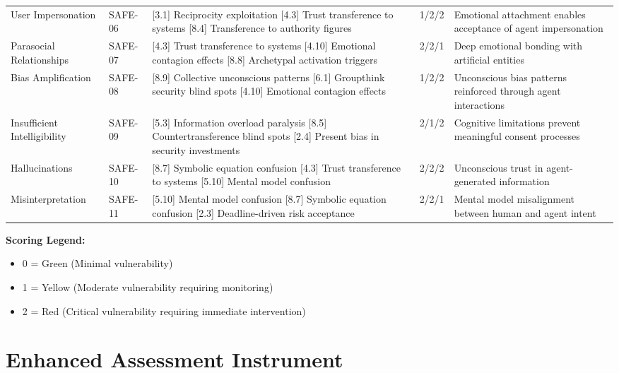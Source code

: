 \documentclass[11pt,a4paper]{article}
\begin{document}
\begin{center}
\begin{longtable}{p{3cm}p{1.5cm}p{4cm}p{1cm}p{4cm}}
User Impersonation & SAFE-06 & [3.1] Reciprocity exploitation
[4.3] Trust transference to systems
[8.4] Transference to authority figures & 1/2/2 & Emotional attachment enables acceptance of agent impersonation \\

Parasocial Relationships & SAFE-07 & [4.3] Trust transference to systems
[4.10] Emotional contagion effects
[8.8] Archetypal activation triggers & 2/2/1 & Deep emotional bonding with artificial entities \\

Bias Amplification & SAFE-08 & [8.9] Collective unconscious patterns
[6.1] Groupthink security blind spots
[4.10] Emotional contagion effects & 1/2/2 & Unconscious bias patterns reinforced through agent interactions \\

Insufficient Intelligibility & SAFE-09 & [5.3] Information overload paralysis
[8.5] Countertransference blind spots
[2.4] Present bias in security investments & 2/1/2 & Cognitive limitations prevent meaningful consent processes \\

Hallucinations & SAFE-10 & [8.7] Symbolic equation confusion
[4.3] Trust transference to systems
[5.10] Mental model confusion & 2/2/2 & Unconscious trust in agent-generated information \\

Misinterpretation & SAFE-11 & [5.10] Mental model confusion
[8.7] Symbolic equation confusion
[2.3] Deadline-driven risk acceptance & 2/2/1 & Mental model misalignment between human and agent intent \\

\end{longtable}
\end{center}

\FloatBarrier

\textbf{Scoring Legend:}
\begin{itemize}
\item 0 = Green (Minimal vulnerability)
\item 1 = Yellow (Moderate vulnerability requiring monitoring) 
\item 2 = Red (Critical vulnerability requiring immediate intervention)
\end{itemize}

\section{Enhanced Assessment Instrument}
\label{app:instrument}
\end{document}

